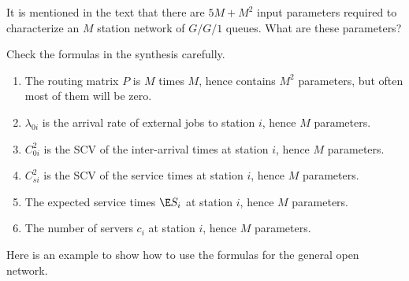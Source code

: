 \begin{exercise}
  It is mentioned in the text that there are $5M+M^2$ input parameters
  required to characterize an $M$ station network of $G/G/1$ queues. What are these parameters?
  \begin{hint}
 Check the formulas in the synthesis carefully.
  \end{hint}
  \begin{solution}
    \begin{enumerate}
    \item The routing matrix $P$ is $M$ times $M$, hence contains
      $M^2$ parameters, but often most of them will be zero.
    \item $\lambda_{0i}$ is the arrival rate of external jobs to station $i$, hence $M$ parameters.
    \item $C_{0i}^2$ is the SCV of the inter-arrival times at station
      $i$, hence $M$ parameters.
    \item $C_{si}^2$ is the SCV of the service times at station $i$,
      hence $M$ parameters.
    \item The expected service times $\E S_i$ at station $i$, 
      hence $M$ parameters.
    \item The number of servers $c_i$ at station $i$, hence $M$
      parameters.
    \end{enumerate}
  \end{solution}
\end{exercise}


Here is an example to show how to use the formulas for the general open network.

